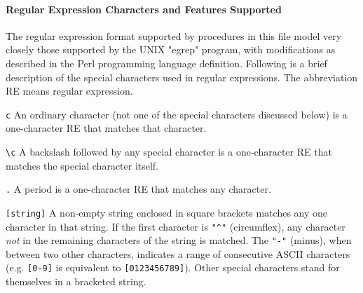 



\paragraph{Regular Expression Characters and Features Supported}
The regular expression format supported by procedures in this file model
very closely those supported by the UNIX
"egrep" program, with modifications as
described in the Perl programming language definition. Following is a
brief description of the special characters used in regular
expressions. The abbreviation RE means regular expression.

\texttt{c} An ordinary character (not one of the special characters
discussed below) is a one-character RE that matches that character.

\texttt{{\textbackslash}c} A backslash followed by any special character
is a one-character RE that matches the special character itself. %

\texttt{.} A period is a one-character RE that matches any character.

\texttt{[string]} A non-empty string enclosed in square brackets
matches any one character in that string. If the
first character is \texttt{"\^{}"}
(circumflex), any character {\em not\/} in the remaining
characters of the string is matched. The \texttt{"-"}
(minus), when between two other characters, indicates a
range of consecutive ASCII characters (e.g. \texttt{[0-9]}
is equivalent to \texttt{[0123456789]}). Other special characters stand
for themselves in a bracketed string.

